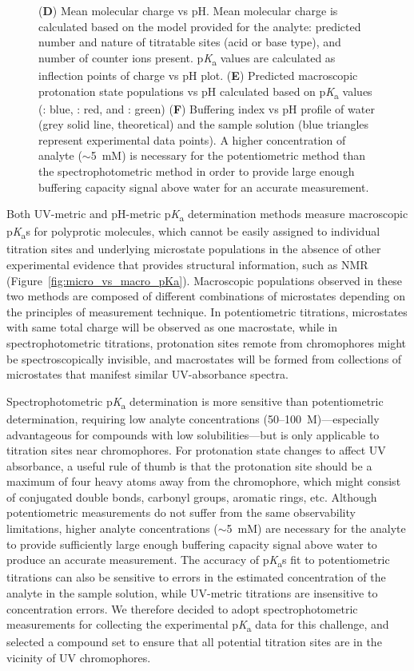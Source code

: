 \documentclass[9pt,lineno]{elife}
\newcommand{\pKa}{p\textit{K}\textsubscript{a}}
\begin{document}
\begin{figure}
{(\textbf{D}) Mean molecular charge vs pH. 
Mean molecular charge is calculated based on the model provided for the analyte: predicted number and nature of titratable sites (acid or base type), and number of counter ions present. 
\pKa{} values are calculated as inflection points of charge vs pH plot. 
(\textbf{E}) Predicted macroscopic protonation state populations vs pH calculated based on \pKa{} values (: blue, : red, and : green) 
(\textbf{F}) Buffering index vs pH profile of water (grey solid line, theoretical) and the sample solution (blue triangles represent experimental data points). 
A higher concentration of analyte ($\sim$5~mM) is necessary for the potentiometric method than the spectrophotometric method in order to provide large enough buffering capacity signal above water for an accurate measurement. 
}
\label{fig:UVmetric_vs_pHmetric_pKa}
\end{figure}

Both UV-metric and pH-metric \pKa{} determination methods measure macroscopic \pKa{}s for polyprotic molecules, which cannot be easily assigned to individual titration sites and underlying microstate populations in the absence of other experimental evidence that provides structural information, such as NMR (Figure~\ref{fig:micro_vs_macro_pKa}). 
Macroscopic populations observed in these two methods are composed of different combinations of microstates depending on the principles of measurement technique. 
In potentiometric titrations, microstates with same total charge will be observed as one macrostate, while in spectrophotometric titrations, protonation sites remote from chromophores might be spectroscopically invisible, and macrostates will be formed from collections of microstates that manifest similar UV-absorbance spectra.

Spectrophotometric \pKa{} determination is more sensitive than potentiometric determination, requiring low analyte concentrations (50--100~\micro{}M)---especially advantageous for compounds with low solubilities---but is only applicable to titration sites near chromophores. 
For protonation state changes to affect UV absorbance, a useful rule of thumb is that the protonation site should be a maximum of four heavy atoms away from the chromophore, which might consist of conjugated double bonds, carbonyl groups, aromatic rings, etc.
Although potentiometric measurements do not suffer from the same observability limitations, higher analyte concentrations ($\sim$5~mM) are necessary for the analyte to provide sufficiently large enough buffering capacity signal above water to produce an accurate measurement. 
The accuracy of \pKa{}s fit to potentiometric titrations can also be sensitive to errors in the estimated concentration of the analyte in the sample solution, while UV-metric titrations are insensitive to concentration errors.
We therefore decided to adopt spectrophotometric measurements for collecting the experimental \pKa{} data for this challenge, and selected a compound set to ensure that all potential titration sites are in the vicinity of UV chromophores.
\end{document}
